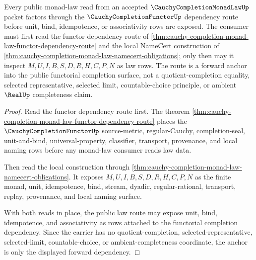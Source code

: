 \begin{theorem}
\label{thm:cauchy-completion-monad-law-functor-forward-anchor}
Every public monad-law read from an accepted $\CauchyCompletionMonadLawUp$ packet factors through the $\CauchyCompletionFunctorUp$ dependency route before unit, bind, idempotence, or associativity rows are exposed. The consumer must first read the functor dependency route of \autoref{thm:cauchy-completion-monad-law-functor-dependency-route} and the local NameCert construction of \autoref{thm:cauchy-completion-monad-law-namecert-obligations}; only then may it inspect $M,U,I,B,S,D,R,H,C,P,N$ as law rows. The route is a forward anchor into the public functorial completion surface, not a quotient-completion equality, selected representative, selected limit, countable-choice principle, or ambient $\RealUp$ completeness claim.
\end{theorem}
\begin{proof}
Read the functor dependency route first. The theorem \autoref{thm:cauchy-completion-monad-law-functor-dependency-route} places the $\CauchyCompletionFunctorUp$ source-metric, regular-Cauchy, completion-seal, unit-and-bind, universal-property, classifier, transport, provenance, and local naming rows before any monad-law consumer reads law data.

Then read the local construction through \autoref{thm:cauchy-completion-monad-law-namecert-obligations}. It exposes $M,U,I,B,S,D,R,H,C,P,N$ as the finite monad, unit, idempotence, bind, stream, dyadic, regular-rational, transport, replay, provenance, and local naming surface.

With both reads in place, the public law route may expose unit, bind, idempotence, and associativity as rows attached to the functorial completion dependency. Since the carrier has no quotient-completion, selected-representative, selected-limit, countable-choice, or ambient-completeness coordinate, the anchor is only the displayed forward dependency.
\end{proof}
